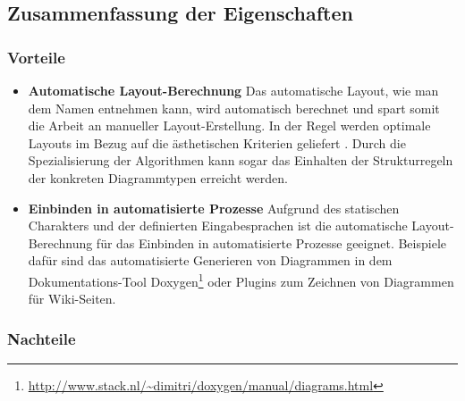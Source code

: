 

\subsection{Zusammenfassung der Eigenschaften}

\subsubsection{Vorteile}

\begin{itemize}
    \item \textbf{Automatische Layout-Berechnung} Das automatische Layout, wie man dem Namen entnehmen kann, wird automatisch berechnet und spart somit die Arbeit an manueller Layout-Erstellung. In der Regel werden optimale Layouts im Bezug auf die ästhetischen Kriterien geliefert \cite{Maier12A-Pattern-based}. Durch die Spezialisierung der Algorithmen kann sogar das Einhalten der Strukturregeln der konkreten Diagrammtypen erreicht werden.
    \item \textbf{Einbinden in automatisierte Prozesse} Aufgrund des statischen Charakters und der definierten Eingabesprachen ist die automatische Layout-Berechnung für das Einbinden in automatisierte Prozesse geeignet. Beispiele dafür sind das automatisierte Generieren von Diagrammen in dem Dokumentations-Tool Doxygen\footnote{\url{http://www.stack.nl/~dimitri/doxygen/manual/diagrams.html}} oder Plugins zum Zeichnen von Diagrammen für Wiki-Seiten.
\end{itemize}

\subsubsection{Nachteile}

